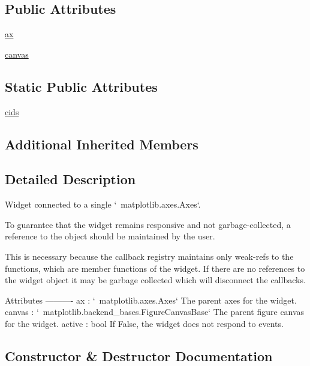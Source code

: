 \subsection*{Public Attributes}
\begin{DoxyCompactItemize}
\item 
\hyperlink{classmatplotlib_1_1widgets_1_1AxesWidget_ac0722858b7001d10a42055dc90420b4f}{ax}
\item 
\hyperlink{classmatplotlib_1_1widgets_1_1AxesWidget_a5c054a84c588ee0524c32f1ea6fbc90a}{canvas}
\end{DoxyCompactItemize}
\subsection*{Static Public Attributes}
\begin{DoxyCompactItemize}
\item 
\hyperlink{classmatplotlib_1_1widgets_1_1AxesWidget_a86ddb97c4e1391b997544cc131f65b9c}{cids}
\end{DoxyCompactItemize}
\subsection*{Additional Inherited Members}


\subsection{Detailed Description}
\begin{DoxyVerb}Widget connected to a single `~matplotlib.axes.Axes`.

To guarantee that the widget remains responsive and not garbage-collected,
a reference to the object should be maintained by the user.

This is necessary because the callback registry
maintains only weak-refs to the functions, which are member
functions of the widget.  If there are no references to the widget
object it may be garbage collected which will disconnect the callbacks.

Attributes
----------
ax : `~matplotlib.axes.Axes`
    The parent axes for the widget.
canvas : `~matplotlib.backend_bases.FigureCanvasBase`
    The parent figure canvas for the widget.
active : bool
    If False, the widget does not respond to events.
\end{DoxyVerb}
 

\subsection{Constructor \& Destructor Documentation}
\mbox{\label{classmatplotlib_1_1widgets_1_1AxesWidget_af6e9ecdcf48c7bc35137c54ffdb6bfa8}} 
